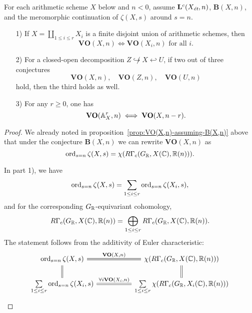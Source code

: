 \documentclass{article}
\numberwithin{equation}{section}
\begin{document}
\begin{proposition}
  \label{prop:compatibility-of-VO(X,n)}
  For each arithmetic scheme $X$ below and $n < 0$, assume
  $\mathbf{L}^c (X_\et,n)$, $\mathbf{B} (X,n)$, and the meromorphic continuation
  of $\zeta (X,s)$ around $s = n$.

  \begin{enumerate}
  \item[1)] If $X = \coprod_{1 \le i \le r} X_i$ is a finite disjoint union of
    arithmetic schemes, then
    $$\mathbf{VO} (X,n) \iff \mathbf{VO} (X_i,n)\text{ for all }i.$$

  \item[2)] For a closed-open decomposition
    $Z \not\hookrightarrow X \hookleftarrow U$, if two out of three conjectures
    \[ \mathbf{VO} (X,n), \quad
      \mathbf{VO} (Z,n), \quad
      \mathbf{VO} (U,n) \]
    hold, then the third holds as well.

  \item[3)] For any $r \ge 0$, one has
    $$\mathbf{VO} (\AA^r_X, n) \iff \mathbf{VO} (X, n-r).$$
  \end{enumerate}

  \begin{proof}
    We already noted in proposition~\ref{prop:VO(X,n)-assuming-B(X,n)} above
    that under the conjecture $\mathbf{B} (X,n)$ we can rewrite
    $\mathbf{VO} (X,n)$ as
    $$\ord_{s=n} \zeta (X,s) = \chi (R\Gamma_c (G_\RR, X(\CC), \RR (n))).$$

    In part 1), we have
    $$\ord_{s=n} \zeta (X,s) = \sum_{1 \le i \le r} \ord_{s=n} \zeta (X_i,s),$$
    and for the corresponding $G_\RR$-equivariant cohomology,
    \[ R\Gamma_c (G_\RR, X(\CC), \RR (n)) =
      \bigoplus_{1 \le i \le r} R\Gamma_c (G_\RR, X(\CC), \RR (n)). \]
    The statement follows from the additivity of Euler characteristic:
    \[ \begin{tikzcd}[column sep=5em]
        \ord_{s=n} \zeta (X,s) \ar[equals]{r}{\mathbf{VO} (X,n)}\ar[equals]{d} & \chi (R\Gamma_c (G_\RR, X(\CC), \RR (n))) \ar[equals]{d} \\
        \sum\limits_{1 \le i \le r} \ord_{s=n} \zeta (X_i,s) \ar[equals]{r}{\forall i \mathbf{VO} (X_i,n)} & \sum\limits_{1 \le i \le r} \chi (R\Gamma_c (G_\RR, X_i (\CC), \RR (n)))
      \end{tikzcd} \]


\end{proof}
\end{proposition}
\end{document}
